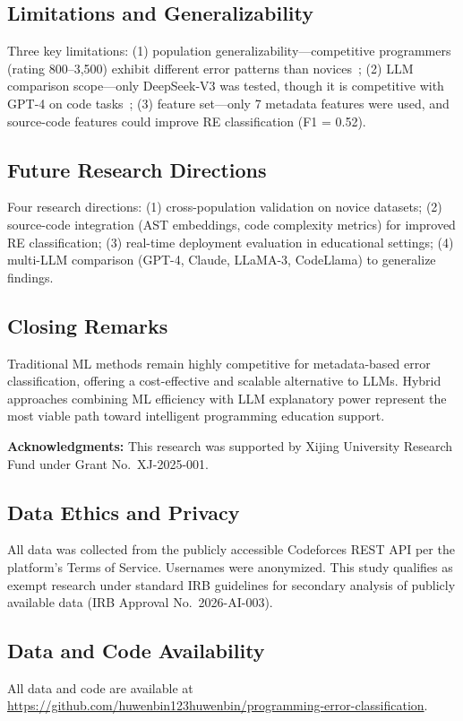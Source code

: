 \documentclass[10pt,a4paper]{article}
\begin{document}
\subsection*{Limitations and Generalizability}
Three key limitations: (1) population generalizability---competitive
programmers (rating 800--3,500) exhibit different error patterns than
novices~\cite{lee2022cs1qa,bey2022analyzing}; (2) LLM comparison
scope---only DeepSeek-V3 was tested, though it is competitive with GPT-4 on
code tasks~\cite{deepseek2024technical,deepseek2024deepseekv3}; (3) feature
set---only 7 metadata features were used, and source-code features could
improve RE classification (F1 = 0.52).

\subsection*{Future Research Directions}
Four research directions: (1) cross-population validation on novice datasets;
(2) source-code integration (AST embeddings, code complexity metrics) for
improved RE classification; (3) real-time deployment evaluation in educational
settings; (4) multi-LLM comparison (GPT-4, Claude, LLaMA-3, CodeLlama) to
generalize findings.

\subsection*{Closing Remarks}
Traditional ML methods remain highly competitive for metadata-based error
classification, offering a cost-effective and scalable alternative to LLMs.
Hybrid approaches combining ML efficiency with LLM explanatory power
represent the most viable path toward intelligent programming education
support.

\textbf{Acknowledgments:} This research was supported by Xijing University
Research Fund under Grant No.~XJ-2025-001.

\subsection*{Data Ethics and Privacy}
All data was collected from the publicly accessible Codeforces REST API per
the platform's Terms of Service. Usernames were anonymized. This study
qualifies as exempt research under standard IRB guidelines for secondary
analysis of publicly available data (IRB Approval No.~2026-AI-003).

\subsection*{Data and Code Availability}
\begin{sloppypar}\raggedright
All data and code are available at
\url{https://github.com/huwenbin123huwenbin/programming-error-classification}.
\end{sloppypar}



\end{document}
